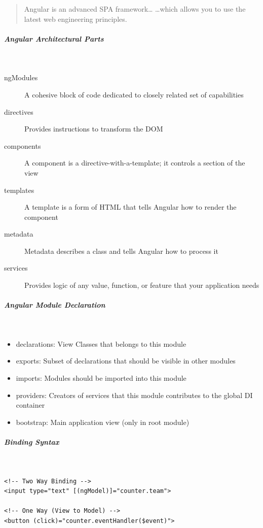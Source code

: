 \documentclass[11pt,twoside,landscape]{article}
\begin{document}
\begin{multicols}{3}
\begin{quote}
Angular is an advanced SPA framework…
…which allows you to use the latest web engineering principles.
\end{quote}
\subparagraph{Angular Architectural Parts} \
\label{sec:orga17d027}
\begin{description}
\item[{ngModules}] A cohesive block of code dedicated to closely related set of capabilities
\item[{directives}] Provides instructions to transform the DOM
\item[{components}] A component is a directive-with-a-template; it controls a section of the view
\item[{templates}] A template is a form of HTML that tells Angular how to render the component
\item[{metadata}] Metadata describes a class and tells Angular how to process it
\item[{services}] Provides logic of any value, function, or feature that your application needs
\end{description}
\subparagraph{Angular Module Declaration} \
\label{sec:org4b161d5}
\begin{itemize}
\item declarations: View Classes that belongs to this module
\item exports: Subset of declarations that should be visible in other modules
\item imports: Modules should be imported into this module
\item providers: Creators of services that this module contributes to the global DI container
\item bootstrap: Main application view (only in root module)
\end{itemize}
\subparagraph{Binding Syntax} \
\label{sec:org5dba381}
\begin{listing}[htbp]
\begin{verbatim}
<!-- Two Way Binding -->
<input type="text" [(ngModel)]="counter.team">

<!-- One Way (View to Model) -->
<button (click)="counter.eventHandler($event)">


\end{verbatim}
\end{listing}
\end{multicols}
\end{document}

